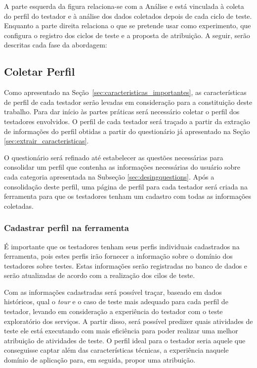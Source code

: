 A parte esquerda da figura relaciona-se com a Análise e está vinculada à coleta do perfil do testador e à análise dos dados coletados depois de cada ciclo de teste. Enquanto a parte direita relaciona o que se pretende usar como experimento, que configura o registro dos ciclos de teste e a proposta de atribuição. A seguir, serão descritas cada fase da abordagem:

\subsection{Coletar Perfil}

Como apresentado na Seção~\ref{sec:caracteristicas_importantes}, as características de perfil de cada testador serão levadas em consideração para a constituição deste trabalho. Para dar início às partes práticas será necessário coletar o perfil dos testadores envolvidos. O perfil de cada testador será traçado a partir da extração de informações do perfil obtidas a partir do questionário já apresentado na Seção \ref{sec:extrair_caracteristicas}.

O questionário será refinado até estabelecer as questões necessárias para consolidar um perfil que contenha as informações necessárias do usuário sobre cada categoria apresentada na Subseção \ref{sec:desingquestions}. Após a consolidação deste perfil, uma página de perfil para cada testador será criada na ferramenta \itractool para que os testadores tenham um cadastro com todas as informações coletadas.

\subsubsection{Cadastrar perfil na ferramenta \itractool}

É importante que os testadores tenham seus perfis individuais cadastrados na ferramenta, pois estes perfis irão fornecer a informação sobre o domínio dos testadores sobre testes. Estas informações serão registradas no banco de dados e serão atualizadas de acordo com a realização dos cilos de teste.

Com as informações cadastradas será possível traçar, baseado em dados históricos, qual o \textit{tour} e o caso de teste mais adequado para cada perfil de testador, levando em consideração a experiência do testador com o teste exploratório dos serviços. A partir disso, será possível predizer quais atividades de teste ele está executando com mais eficiência para poder realizar uma melhor atribuição de atividades de teste. O perfil ideal para o testador seria aquele que conseguisse captar além das características técnicas, a experiência naquele domínio de aplicação para, em seguida, propor uma atribuição.

